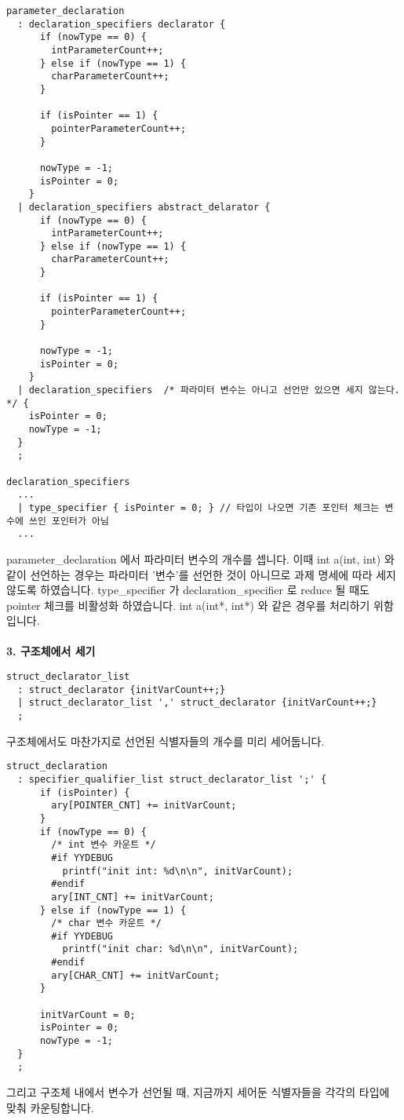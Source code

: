 \documentclass{article}
\begin{document}
\begin{verbatim}
parameter_declaration
  : declaration_specifiers declarator {
      if (nowType == 0) {
        intParameterCount++;
      } else if (nowType == 1) {
        charParameterCount++;
      }

      if (isPointer == 1) {
        pointerParameterCount++;
      }

      nowType = -1; 
      isPointer = 0;
    }
  | declaration_specifiers abstract_delarator {
      if (nowType == 0) {
        intParameterCount++;
      } else if (nowType == 1) {
        charParameterCount++;
      }

      if (isPointer == 1) {
        pointerParameterCount++;
      }
      
      nowType = -1; 
      isPointer = 0;
    }   
  | declaration_specifiers  /* 파라미터 변수는 아니고 선언만 있으면 세지 않는다. */ {
    isPointer = 0;
    nowType = -1;
  }
  ;
  
declaration_specifiers
  ...
  | type_specifier { isPointer = 0; } // 타입이 나오면 기존 포인터 체크는 변수에 쓰인 포인터가 아님
  ...
\end{verbatim}
parameter\_declaration 에서 파라미터 변수의 개수를 셉니다. 이때 int a(int, int) 와 같이 선언하는 경우는 파라미터 '변수'를 선언한 것이 아니므로 과제 명세에 따라 세지 않도록 하였습니다. type\_specifier 가 declaration\_specifier 로 reduce 될 때도 pointer 체크를 비활성화 하였습니다. int a(int*, int*) 와 같은 경우를 처리하기 위함입니다.\\\\
\textbf{3. 구조체에서 세기}
\begin{verbatim}
struct_declarator_list
  : struct_declarator {initVarCount++;}
  | struct_declarator_list ',' struct_declarator {initVarCount++;}
  ;
\end{verbatim}
구조체에서도 마찬가지로 선언된 식별자들의 개수를 미리 세어둡니다.
\begin{verbatim}
struct_declaration
  : specifier_qualifier_list struct_declarator_list ';' {
      if (isPointer) {
        ary[POINTER_CNT] += initVarCount;
      }
      if (nowType == 0) {
        /* int 변수 카운트 */
        #if YYDEBUG
          printf("init int: %d\n\n", initVarCount);
        #endif
        ary[INT_CNT] += initVarCount;
      } else if (nowType == 1) {
        /* char 변수 카운트 */
        #if YYDEBUG
          printf("init char: %d\n\n", initVarCount);
        #endif
        ary[CHAR_CNT] += initVarCount;
      }

      initVarCount = 0;
      isPointer = 0;
      nowType = -1;
  }
  ;
\end{verbatim}
그리고 구조체 내에서 변수가 선언될 때, 지금까지 세어둔 식별자들을 각각의 타입에 맞춰 카운팅합니다.
\end{document}
